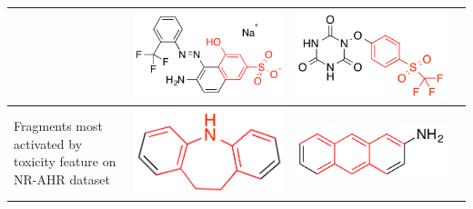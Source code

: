 \documentclass[landscape,a0b,final,a4resizeable]{include/a0poster}
\begin{document}
\begin{poster}
\begin{multicols}{3}
\begin{center}
\begin{tabular}{>{\centering}m{\mywidthb} >{\centering}m{\mywidtha} >{\centering}m{\mywidtha} >{\centering\arraybackslash}m{\mywidtha}}
& \includegraphics[width=\mywidtha]{figures/jorge-figures/8.png}
& \includegraphics[width=\mywidtha]{figures/jorge-figures/9.png}\\
\midrule
Fragments most activated by toxicity feature on NR-AHR dataset
& \includegraphics[width=\mywidtha]{figures/jorge-figures/10.png} 
& \includegraphics[width=\mywidtha]{figures/jorge-figures/11.png}

\end{tabular}
\end{center}
\end{multicols}
\end{poster}
\end{document}
